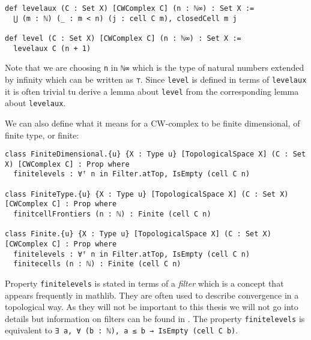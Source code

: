 \begin{lstlisting}
def levelaux (C : Set X) [CWComplex C] (n : ℕ∞) : Set X :=
  ⋃ (m : ℕ) (_ : m < n) (j : cell C m), closedCell m j

def level (C : Set X) [CWComplex C] (n : ℕ∞) : Set X :=
  levelaux C (n + 1)
\end{lstlisting}

Note that we are choosing \lstinline{n} in \lstinline{ℕ∞} which is the type of natural numbers extended by infinity which can be written as \lstinline{⊤}. 
Since \lstinline{level} is defined in terms of \lstinline{levelaux} it is often trivial tu derive a lemma about \lstinline{level} from the corresponding lemma about \lstinline{levelaux}. 

We can also define what it means for a CW-complex to be finite dimensional, of finite type, or finite: 

\begin{lstlisting}
class FiniteDimensional.{u} {X : Type u} [TopologicalSpace X] (C : Set X) [CWComplex C] : Prop where
  finitelevels : ∀ᶠ n in Filter.atTop, IsEmpty (cell C n)

class FiniteType.{u} {X : Type u} [TopologicalSpace X] (C : Set X) [CWComplex C] : Prop where
  finitcellFrontiers (n : ℕ) : Finite (cell C n)

class Finite.{u} {X : Type u} [TopologicalSpace X] (C : Set X) [CWComplex C] : Prop where
  finitelevels : ∀ᶠ n in Filter.atTop, IsEmpty (cell C n)
  finitecells (n : ℕ) : Finite (cell C n)
\end{lstlisting}

Property \lstinline{finitelevels} is stated in terms of a \emph{filter} which is a concept that appears frequently in mathlib.
They are often used to describe convergence in a topological way. 
As they will not be important to this thesis we will not go into details but information on filters can be found in \cite{Bourbaki1966}. 
The property \lstinline{finitelevels} is equivalent to \lstinline{∃ a, ∀ (b : ℕ), a ≤ b → IsEmpty (cell C b)}. 
